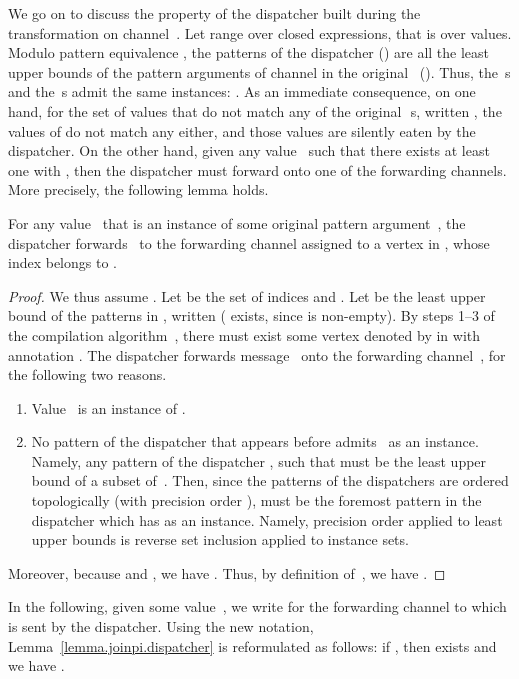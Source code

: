 \documentclass{LMCS}
\newcommand{\forget}[1]{}
\renewcommand{\_}{\mathord{\rule[-.25ex]{1ex}{.15ex}}}
\begin{document}
We go on to discuss the property of the dispatcher built during the
transformation on channel~. Let  range over closed expressions,
that is over values. Modulo pattern equivalence , the patterns
of the dispatcher () are all the least upper
bounds of the pattern arguments of channel  in the original~
(). Thus, the \,s and the \,s
admit the same instances: .  As an immediate
consequence, on one hand, for the set of values that do not match any
of the original~\,s, written , the values of  do not match
any  either, and those values are silently eaten by the
dispatcher. On the other
hand, given any value~ such that there exists at least one 
with , then the dispatcher must forward  onto
one of the forwarding channels. More precisely, the following lemma holds.
\begin{lem}\label{lemma.joinpi.dispatcher}
  For any value~ that is an instance of some original pattern
  argument~, the dispatcher forwards~ to the forwarding
  channel assigned to a vertex in , whose index belongs to
  .
\end{lem}
\begin{proof}
  We thus assume .  Let  be the set of indices  and . Let
   be the least upper bound of the patterns in
  , written  ( exists, since
   is non-empty).  By steps 1--3 of
  the compilation algorithm~, there must exist some vertex denoted by
   in  with annotation .    
  The dispatcher forwards message~ onto the forwarding
  channel~, for the following two
  reasons.
  \begin{enumerate}[(1)]
  \item Value~ is an instance of .
  \item No pattern of the dispatcher that appears before
   admits~ as an instance.
  Namely, any pattern of the dispatcher ,
  such that  must be the least upper
  bound of a subset of~. Then, since the
  patterns of the dispatchers are ordered topologically (with
  precision order ),  must be the foremost
  pattern in the dispatcher which has  as an instance.
  Namely, precision order  applied to least upper bounds is
  reverse set inclusion applied to instance sets.
  \end{enumerate}
  Moreover, because  and , we have .
  Thus, by definition of~, we have . \forget{\qed}
\end{proof}

In the following, given some value~, we write  for the forwarding
channel to which  is sent by the dispatcher.  Using the new notation,
Lemma~\ref{lemma.joinpi.dispatcher} is reformulated as follows: if , then  exists and we have .
\end{document}
